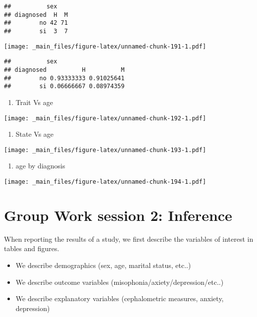 \documentclass[
]{book}
\providecommand{\tightlist}{%
  \setlength{\itemsep}{0pt}\setlength{\parskip}{0pt}}
\begin{document}
\begin{verbatim}
##          sex
## diagnosed  H  M
##        no 42 71
##        si  3  7
\end{verbatim}

\texttt{[image: \_main\_files/figure-latex/unnamed-chunk-191-1.pdf]}

\begin{verbatim}
##          sex
## diagnosed          H          M
##        no 0.93333333 0.91025641
##        si 0.06666667 0.08974359
\end{verbatim}

\begin{enumerate}
\def\labelenumi{\alph{enumi}.}
\setcounter{enumi}{7}
\tightlist
\item
  Trait Vs age
\end{enumerate}

\texttt{[image: \_main\_files/figure-latex/unnamed-chunk-192-1.pdf]}

\begin{enumerate}
\def\labelenumi{\roman{enumi}.}
\tightlist
\item
  State Vs age
\end{enumerate}

\texttt{[image: \_main\_files/figure-latex/unnamed-chunk-193-1.pdf]}

\begin{enumerate}
\def\labelenumi{\alph{enumi}.}
\setcounter{enumi}{9}
\tightlist
\item
  age by diagnosis
\end{enumerate}

\texttt{[image: \_main\_files/figure-latex/unnamed-chunk-194-1.pdf]}

\hypertarget{group-work-session-2-inference}{%
\section{Group Work session 2: Inference}\label{group-work-session-2-inference}}

When reporting the results of a study, we first describe the variables of interest in tables and figures.

\begin{itemize}
\tightlist
\item
  We describe demographics (sex, age, marital status, etc..)
\item
  We describe outcome variables (misophonia/axiety/depression/etc..)
\item
  We describe explanatory variables (cephalometric measures, anxiety, depression)
\end{itemize}
\end{document}

